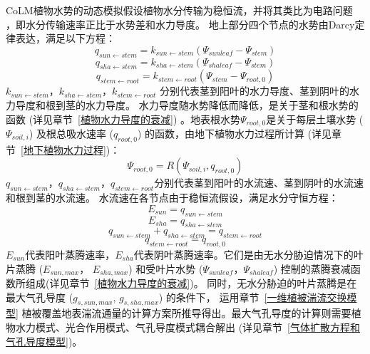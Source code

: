 CoLM植物水势的动态模拟假设植物水分传输为稳恒流，并将其类比为电路问题~
\citep{van1948water}，即水分传输速率正比于水势差和水力导度。
地上部分四个节点的水势由Darcy定律表达，满足以下方程：
\begin{equation}\label{q_sunstem}
q_{ {sun \leftarrow stem }}=k_{{sun} \leftarrow  {stem}}\left(\Psi_{sunleaf}-\Psi_{stem}\right)
\end{equation}
\begin{equation}
q_{ {sha \leftarrow stem }}=k_{ {sha} \leftarrow {stem}}\left(\Psi_{shaleaf}-\Psi_{ {stem }}\right)
\end{equation}
\begin{equation}
q_{ {stem \leftarrow root }}=k_{ {stem } \leftarrow  { root }}\left(\Psi_{ {stem }}-\Psi_{ {root }, 0}\right)
\end{equation}
$k_{sun \leftarrow stem}$，$k_{sha \leftarrow stem }$，$k_{stem \leftarrow root }$ 分别代表茎到阳叶的水力导度、茎到阴叶的水力导度和根到茎的水力导度。
水力导度随水势降低而降低，是关于茎和根水势的函数 (详见章节~\ref{植物水力导度的衰减}) 。地表根水势$\Psi_{root,0}$是关于每层土壤水势 ($\Psi_{soil,i}$) 
及根总吸水速率 ($q_{root,0}$) 的函数，由地下植物水力过程所计算 (详见章节~\ref{地下植物水力过程})：
\begin{equation}\label{Psi_root_0}
\Psi_{root, 0}=R\left(\Psi_{ {soil }, i}, q_{root, 0}\right)
\end{equation}
$q_{sun \leftarrow stem}$，$q_{sha \leftarrow stem }$，$q_{stem \leftarrow root }$分别代表茎到阳叶的水流速、茎到阴叶的水流速和根到茎的水流速。
水流速在各节点由于稳恒流假设，满足水分守恒方程：
\begin{equation}
E_{sun}=q_{sun \leftarrow  stem}
\end{equation}
\begin{equation}
E_{ {sha }}=q_{ sha \leftarrow stem}
\end{equation}
\begin{equation}
q_{ {sun \leftarrow stem }}+q_{ {sha \leftarrow stem }}=q_{ {stem \leftarrow root }}
\end{equation}
\begin{equation}\label{q_stemroot}
q_{stem \leftarrow root}=q_{root, 0}
\end{equation}
$E_{sun}$代表阳叶蒸腾速率，$E_{sha}$代表阴叶蒸腾速率。它们是由无水分胁迫情况下的叶片蒸腾 ($E_{sun,max}$， $E_{sha,max}$) 
和受叶片水势 ($\Psi_{sunleaf}$，$\Psi_{shaleaf}$) 控制的蒸腾衰减函数所组成(详见章节~\ref{植物水力导度的衰减})。
同时，无水分胁迫的叶片蒸腾是在最大气孔导度 ($g_{s,sun,max}$, $g_{s,sha,max}$) 的条件下，
运用章节~\ref{一维植被湍流交换模型} 植被覆盖地表湍流通量的计算方案所推导得出。最大气孔导度的计算则需要植物水力模式、光合作用模式、气孔导度模式耦合解出 (详见章节~\ref{气体扩散方程和气孔导度模型})。


